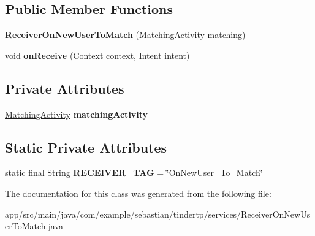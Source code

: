 \subsection*{Public Member Functions}
\begin{DoxyCompactItemize}
\item 
{\bfseries Receiver\+On\+New\+User\+To\+Match} (\hyperlink{classcom_1_1example_1_1sebastian_1_1tindertp_1_1MatchingActivity}{Matching\+Activity} matching)\hypertarget{classcom_1_1example_1_1sebastian_1_1tindertp_1_1services_1_1ReceiverOnNewUserToMatch_a20173e9307d37aa6fad9e7662b615868}{}\label{classcom_1_1example_1_1sebastian_1_1tindertp_1_1services_1_1ReceiverOnNewUserToMatch_a20173e9307d37aa6fad9e7662b615868}

\item 
void {\bfseries on\+Receive} (Context context, Intent intent)\hypertarget{classcom_1_1example_1_1sebastian_1_1tindertp_1_1services_1_1ReceiverOnNewUserToMatch_a3be4b4d8f52661254379706c648b9f18}{}\label{classcom_1_1example_1_1sebastian_1_1tindertp_1_1services_1_1ReceiverOnNewUserToMatch_a3be4b4d8f52661254379706c648b9f18}

\end{DoxyCompactItemize}
\subsection*{Private Attributes}
\begin{DoxyCompactItemize}
\item 
\hyperlink{classcom_1_1example_1_1sebastian_1_1tindertp_1_1MatchingActivity}{Matching\+Activity} {\bfseries matching\+Activity}\hypertarget{classcom_1_1example_1_1sebastian_1_1tindertp_1_1services_1_1ReceiverOnNewUserToMatch_acccc2c5700e913381baa4673801fdbe0}{}\label{classcom_1_1example_1_1sebastian_1_1tindertp_1_1services_1_1ReceiverOnNewUserToMatch_acccc2c5700e913381baa4673801fdbe0}

\end{DoxyCompactItemize}
\subsection*{Static Private Attributes}
\begin{DoxyCompactItemize}
\item 
static final String {\bfseries R\+E\+C\+E\+I\+V\+E\+R\+\_\+\+T\+AG} = \char`\"{}On\+New\+User\+\_\+\+To\+\_\+\+Match\char`\"{}\hypertarget{classcom_1_1example_1_1sebastian_1_1tindertp_1_1services_1_1ReceiverOnNewUserToMatch_aa390fea4eeacd3cfa4378666db8ff2db}{}\label{classcom_1_1example_1_1sebastian_1_1tindertp_1_1services_1_1ReceiverOnNewUserToMatch_aa390fea4eeacd3cfa4378666db8ff2db}

\end{DoxyCompactItemize}


The documentation for this class was generated from the following file\+:\begin{DoxyCompactItemize}
\item 
app/src/main/java/com/example/sebastian/tindertp/services/Receiver\+On\+New\+User\+To\+Match.\+java\end{DoxyCompactItemize}
